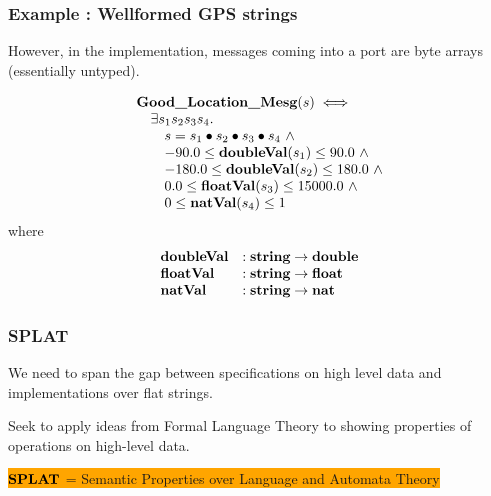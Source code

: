 \documentclass{beamer}
\newcommand{\kemph}[1]{\colorbox{orange}{#1}}
\newcommand{\konst}[1]{\ensuremath{\mbox{\bf{#1}}}}
\begin{document}
\begin{frame}\frametitle{Example : Wellformed GPS strings}

However, in the implementation, messages coming into a port are byte
arrays (essentially untyped).

\[
\begin{array}{l}
 \konst{Good\_Location\_Mesg} (s) \iff \\
\quad   \exists s_1 s_2 s_3 s_4. \\
\qquad      s = s_1 \bullet s_2 \bullet s_3 \bullet s_4 \ \land \\
\qquad    -90.0 \leq \konst{doubleVal}(s_1) \leq 90.0 \ \land \\
\qquad   -180.0 \leq \konst{doubleVal}(s_2) \leq 180.0 \ \land \\
\qquad      0.0 \leq \konst{floatVal}(s_3)  \leq 15000.0 \ \land \\
\qquad        0 \leq \konst{natVal}(s_4) \leq 1
\end{array}
\]
%
\noindent where
%
\[
\begin{array}{ll}
 \konst{doubleVal} & : \konst{string} \to \konst{double} \\
 \konst{floatVal}  & : \konst{string} \to \konst{float}  \\
 \konst{natVal}    & : \konst{string} \to \konst{nat}  \\
\end{array}
\]

\end{frame}

\begin{frame}\frametitle{SPLAT}

We need to span the gap between specifications on high level data and
implementations over flat strings.

Seek to apply ideas from Formal Language Theory to showing properties
of operations on high-level data.

\vspace*{10mm}

\kemph{\konst{SPLAT} = Semantic Properties over Language and Automata Theory}

\end{frame}
\end{document}

